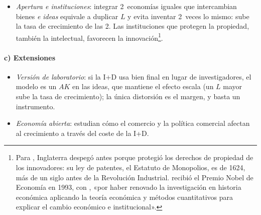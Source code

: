 \documentclass[11pt]{article}
\begin{document}
\begin{itemize}
\item \emph{Apertura e instituciones}: integrar 2~economías iguales que intercambian bienes \emph{e ideas} equivale a duplicar $L$ y evita inventar 2~veces lo mismo: sube la tasa de crecimiento de las 2\nocite{RiveraBatizRomer1991}. Las instituciones que protegen la propiedad, también la intelectual, favorecen la innovación\footnote{Para \textcite{NorthThomas1973}, Inglaterra despegó antes porque protegió los derechos de propiedad de los innovadores: su ley de patentes, el Estatuto de Monopolios, es de 1624, más de un siglo antes de la Revolución Industrial.  recibió el Premio Nobel de Economía en 1993, con , «por haber renovado la investigación en historia económica aplicando la teoría económica y métodos cuantitativos para explicar el cambio económico e institucional»\nocite{NobelPrize1993North}.}.
\end{itemize}

\paragraph{c) Extensiones}

\begin{itemize}
\item \emph{Versión de laboratorio}: si la I+D usa bien final en lugar de investigadores, el modelo es un $AK$ en las ideas, que mantiene el efecto escala (un $L$ mayor sube la tasa de crecimiento); la única distorsión es el margen, y basta un instrumento\nocite{BarroSalaiMartin2004}.
\item \emph{Economía abierta}: \textcite{GrossmanHelpman1991} estudian cómo el comercio y la política comercial afectan al crecimiento a través del coste de la I+D.
\end{itemize}
\end{document}
